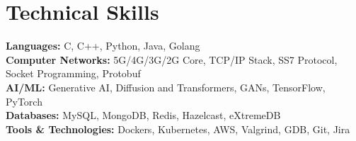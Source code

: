 \section{Technical Skills}
\begin{itemize}[leftmargin=0.15in, label={}]
	\small{\item{
			\textbf{Languages:} C, C++, Python, Java, Golang\\
			\textbf{Computer Networks:} 5G/4G/3G/2G Core, TCP/IP Stack, SS7 Protocol, Socket Programming, Protobuf\\
			\textbf{AI/ML:} Generative AI, Diffusion and Transformers, GANs, TensorFlow, PyTorch\\
			\textbf{Databases:} MySQL, MongoDB, Redis, Hazelcast, eXtremeDB\\
			\textbf{Tools \& Technologies:} Dockers, Kubernetes, AWS, Valgrind, GDB, Git, Jira\\}
		}
\end{itemize}